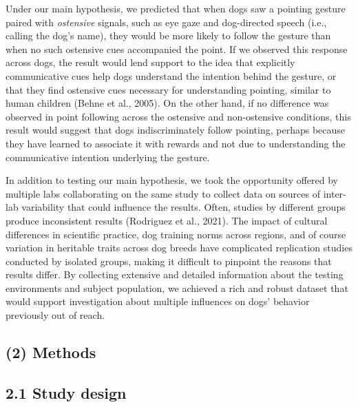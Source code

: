 \documentclass[
  pub,floatsintext]{apa6}
\begin{document}
Under our main hypothesis, we predicted that when dogs saw a pointing gesture paired with \emph{ostensive} signals, such as eye gaze and dog-directed speech (i.e., calling the dog's name), they would be more likely to follow the gesture than when no such ostensive cues accompanied the point. If we observed this response across dogs, the result would lend support to the idea that explicitly communicative cues help dogs understand the intention behind the gesture, or that they find ostensive cues necessary for understanding pointing, similar to human children (Behne et al., 2005). On the other hand, if no difference was observed in point following across the ostensive and non-ostensive conditions, this result would suggest that dogs indiscriminately follow pointing, perhaps because they have learned to associate it with rewards and not due to understanding the communicative intention underlying the gesture.

In addition to testing our main hypothesis, we took the opportunity offered by multiple labs collaborating on the same study to collect data on sources of inter-lab variability that could influence the results. Often, studies by different groups produce inconsistent results (Rodriguez et al., 2021). The impact of cultural differences in scientific practice, dog training norms across regions, and of course variation in heritable traits across dog breeds have complicated replication studies conducted by isolated groups, making it difficult to pinpoint the reasons that results differ. By collecting extensive and detailed information about the testing environments and subject population, we achieved a rich and robust dataset that would support investigation about multiple influences on dogs' behavior previously out of reach.

\hypertarget{methods}{%
\subsection{(2) Methods}\label{methods}}

\hypertarget{study-design}{%
\subsection{2.1 Study design}\label{study-design}}
\end{document}
